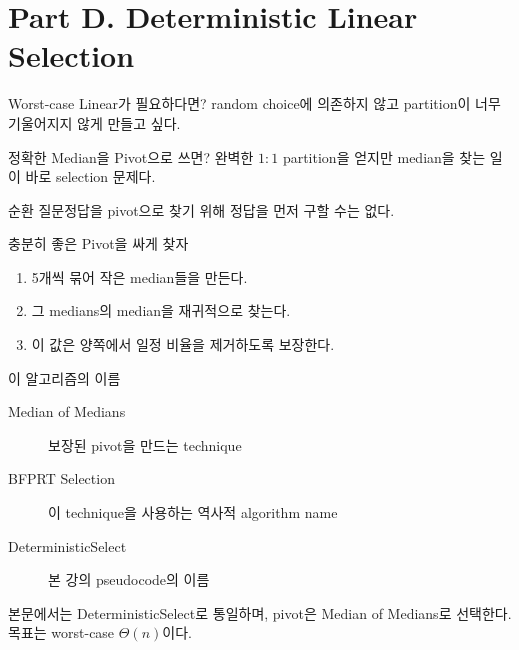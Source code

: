 \section{Part D. Deterministic Linear Selection}
\begin{frame}{Worst-case Linear가 필요하다면?}
random choice에 의존하지 않고 partition이 너무 기울어지지 않게 만들고 싶다.
\end{frame}
\begin{frame}{정확한 Median을 Pivot으로 쓰면?}
완벽한 $1:1$ partition을 얻지만 median을 찾는 일이 바로 selection 문제다.
\begin{alertblock}{순환 질문}정답을 pivot으로 찾기 위해 정답을 먼저 구할 수는 없다.\end{alertblock}
\end{frame}
\begin{frame}{충분히 좋은 Pivot을 싸게 찾자}
\begin{enumerate}\item 5개씩 묶어 작은 median들을 만든다.\item 그 medians의 median을 재귀적으로 찾는다.\item 이 값은 양쪽에서 일정 비율을 제거하도록 보장한다.\end{enumerate}
\end{frame}
\begin{frame}{이 알고리즘의 이름}
\begin{description}
\item[Median of Medians] 보장된 pivot을 만드는 technique
\item[BFPRT Selection] 이 technique을 사용하는 역사적 algorithm name
\item[DeterministicSelect] 본 강의 pseudocode의 이름
\end{description}
본문에서는 \alert{DeterministicSelect}로 통일하며, pivot은 Median of Medians로 선택한다. 목표는 worst-case $\Theta(n)$이다.
\end{frame}
